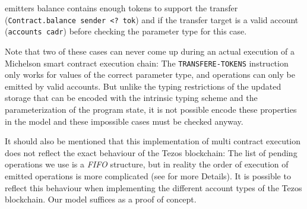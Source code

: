 \begin{itemize}
\begin{itemize}
				emitters balance contains enough tokens to support the transfer
				(\verb/Contract.balance sender <? tok/)
				and if the transfer target is a valid account
				(\verb/accounts cadr/)
				before checking the parameter type for this case.
		\end{itemize}
		Note that two of these cases can never come up during an actual execution of
		a Michelson smart contract execution chain:
		The \verb=TRANSFERE-TOKENS= instruction only works for values of the
		correct parameter type, and operations can only be emitted by valid accounts.
		But unlike the typing restrictions of the updated storage that can be encoded
		with the intrinsic typing scheme and the parameterization of the program state,
		it is not possible encode these properties
		in the model and these impossible cases must be checked anyway.

		It should also be mentioned that this implementation of multi contract execution
		does not reflect the exact behaviour of the Tezos blockchain:
		The list of pending operations we use is a \emph{FIFO} structure,
		but in reality the order of execution of emitted operations is more complicated
		(see \cite{devres} for more Details).
		It is possible to reflect this behaviour when implementing
		the different account types of the Tezos blockchain.
		Our model suffices as a proof of concept.
\end{itemize}


